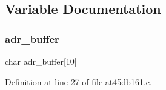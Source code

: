 \subsection{Variable Documentation}
\mbox{\label{at45db161_8c_a6d3fc2ecf4168d09406459b6acaca46f}} 
\subsubsection{adr\+\_\+buffer}
{\footnotesize\ttfamily char adr\+\_\+buffer[10]}



Definition at line 27 of file at45db161.\+c.


